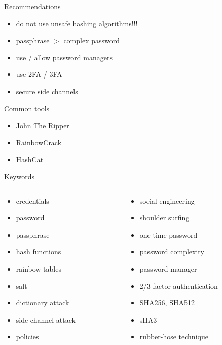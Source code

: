 \documentclass{curs}
\begin{document}
\begin{frame}{Recommendations}
  \begin{itemize}
    \item do not use unsafe hashing algorithms!!!
    \item passphrase $>$ complex password
    \item use / allow password managers
    \item use 2FA / 3FA
    \item secure side channels
  \end{itemize}
\end{frame}

\begin{frame}{Common tools}
  \begin{itemize}
    \item \href{http://www.openwall.com/john/}{John The Ripper}
    \item \href{http://project-rainbowcrack.com/}{RainbowCrack}
    \item \href{https://hashcat.net/hashcat/}{HashCat}
  \end{itemize}
\end{frame}

\begin{frame}{Keywords}
  \begin{columns}
    \begin{column}{0.5\textwidth}
      \begin{itemize}
        \item credentials
        \item password
        \item passphrase
        \item hash functions
        \item rainbow tables
        \item salt
        \item dictionary attack
        \item side-channel attack
        \item policies
      \end{itemize}
    \end{column}
    \begin{column}{0.5\textwidth}
      \begin{itemize}
        \item social engineering
        \item shoulder surfing
        \item one-time password
        \item password complexity
        \item password manager
        \item 2/3 factor authentication
        \item SHA256, SHA512
        \item sHA3
        \item rubber-hose technique
      \end{itemize}
    \end{column}
  \end{columns}
\end{frame}
\end{document}
